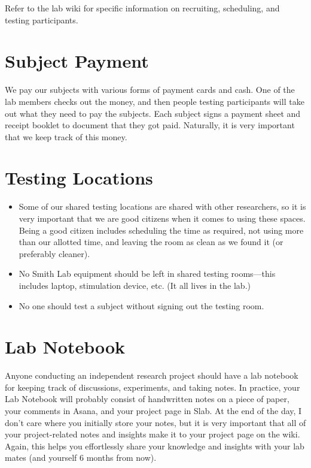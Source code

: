 \documentclass[letterpaper,11pt,oneside]{memoir}
\begin{document}
Refer to the lab wiki for specific information on recruiting, scheduling, and testing participants.


\section{Subject Payment}
\label{sec:subject_payment}

We pay our subjects with various forms of payment cards and cash. One of the lab members checks out the money, and then people testing participants will take out what they need to pay the subjects. Each subject signs a payment sheet and receipt booklet to document that they got paid. Naturally, it is very important that we keep track of this money.



\section{Testing Locations}
\label{sec:testing_locations}

\begin{itemize}
\item Some of our shared testing locations are shared with other researchers, so it is very important that we are good citizens when it comes to using these spaces. Being a good citizen includes scheduling the time as required, not using more than our allotted time, and leaving the room as clean as we found it (or preferably cleaner).
\item No Smith Lab equipment should be left in shared testing rooms---this includes laptop, stimulation device, etc. (It all lives in the lab.)
\item No one should test a subject without signing out the testing room.
\end{itemize}



\section{Lab Notebook}
\label{sec:lab_notebook}

Anyone conducting an independent research project should have a lab notebook for keeping track of discussions, experiments, and taking notes. In practice, your Lab Notebook will probably consist of handwritten notes on a piece of paper, your comments in Asana, and your project page in Slab. At the end of the day, I don't care where you initially store your notes, but it is very important that all of your project-related notes and insights make it to your project page on the wiki. Again, this helps you effortlessly share your knowledge and insights with your lab mates (and yourself 6 months from now). 
\end{document}
